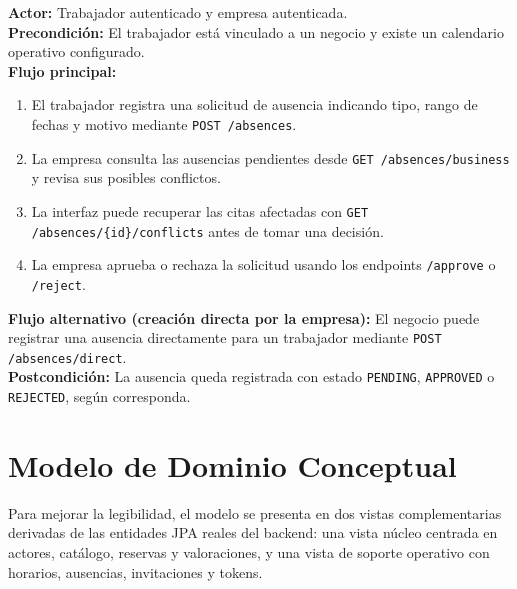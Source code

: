 \documentclass[12pt,a4paper,twoside]{report}
\begin{document}
\begin{tcolorbox}[definicionStyle, title={CU-09 — Solicitud y Gestión de Ausencias}]
\textbf{Actor:} Trabajador autenticado y empresa autenticada. \\
\textbf{Precondición:} El trabajador está vinculado a un negocio y existe un calendario operativo configurado. \\
\textbf{Flujo principal:}
\begin{enumerate}
  \item El trabajador registra una solicitud de ausencia indicando tipo, rango de fechas y motivo mediante \texttt{POST /absences}.
  \item La empresa consulta las ausencias pendientes desde \texttt{GET /absences/business} y revisa sus posibles conflictos.
  \item La interfaz puede recuperar las citas afectadas con \texttt{GET /absences/\{id\}/conflicts} antes de tomar una decisión.
  \item La empresa aprueba o rechaza la solicitud usando los endpoints \texttt{/approve} o \texttt{/reject}.
\end{enumerate}
\textbf{Flujo alternativo (creación directa por la empresa):} El negocio puede registrar una ausencia directamente para un trabajador mediante \texttt{POST /absences/direct}. \\
\textbf{Postcondición:} La ausencia queda registrada con estado \texttt{PENDING}, \texttt{APPROVED} o \texttt{REJECTED}, según corresponda.
\end{tcolorbox}

\section{Modelo de Dominio Conceptual}

Para mejorar la legibilidad, el modelo se presenta en dos vistas complementarias derivadas de las entidades JPA reales del backend: una vista núcleo centrada en actores, catálogo, reservas y valoraciones, y una vista de soporte operativo con horarios, ausencias, invitaciones y tokens.
\end{document}
